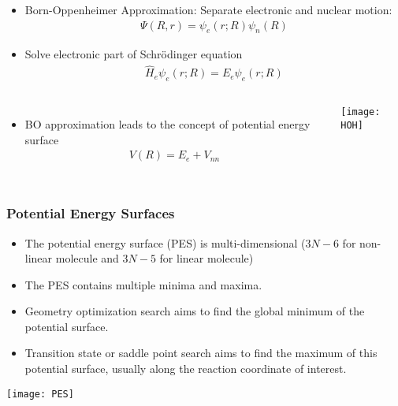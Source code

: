\documentclass[slidestop,mathserif,compress,xcolor=svgnames]{beamer}
\begin{document}
\begin{frame}
\footnotesize{
\begin{itemize}
\item Born-Oppenheimer Approximation: Separate electronic and nuclear motion:
\begin{align*}
\Psi(R,r) = \psi_e(r;R)\psi_n(R)
\end{align*}
\item Solve electronic part of Schr\"{o}dinger equation
\begin{align*}
\hat{H}_e\psi_e(r;R) = E_e\psi_e(r;R)
\end{align*}
\end{itemize}
\begin{columns}
\column{5cm}
\vspace{-0.5cm}
\begin{itemize}
\item 
BO approximation leads to the concept of potential energy surface
\begin{align*}
V(R) = E_e + V_{nn}
\end{align*}
\end{itemize}
\column{5cm}
\vspace{-0.5cm}
\texttt{[image: HOH]}
\end{columns}
}
\end{frame}
\begin{frame}
\frametitle{\small Potential Energy Surfaces}
\footnotesize{
\begin{itemize}
\item The potential energy surface (PES) is multi-dimensional ($3N-6$ for non-linear molecule and $3N-5$ for linear molecule)
\item The PES contains multiple minima and maxima.\let\thefootnote\relax{}
\item Geometry optimization search aims to find the global minimum of the potential surface.
\item Transition state or saddle point search aims to find the maximum of this potential surface, usually along the reaction coordinate of interest.
\end{itemize}
\begin{center}
\texttt{[image: PES]}
\end{center}
}
\end{frame}
\end{document}
